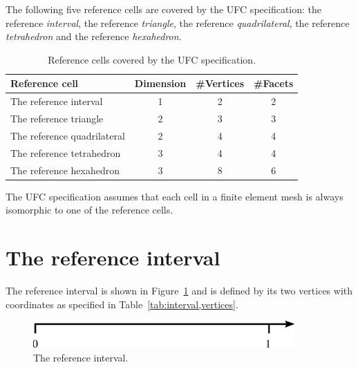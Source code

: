 The following five reference cells are covered by the UFC specification:
the reference \emph{interval},
the reference \emph{triangle},
the reference \emph{quadrilateral},
the reference \emph{tetrahedron} and
the reference \emph{hexahedron}.

\begin{table}[H]
\linespread{1.2}\selectfont
  \begin{center}
    \begin{tabular}{|l|c|c|c|}
      \hline
      Reference cell & Dimension & \#Vertices & \#Facets \\
      \hline
      \hline
      The reference interval      & 1 & 2 & 2 \\
      \hline
      The reference triangle      & 2 & 3 & 3 \\
      \hline
      The reference quadrilateral & 2 & 4 & 4 \\
      \hline
      The reference tetrahedron   & 3 & 4 & 4 \\
      \hline
      The reference hexahedron    & 3 & 8 & 6 \\
      \hline
    \end{tabular}
    \caption{Reference cells covered by the UFC specification.}
  \end{center}
\end{table}

The UFC specification assumes that each cell in a finite element mesh
is always isomorphic to one of the reference cells.

\newpage
\section{The reference interval}

The reference interval is shown in Figure~\ref{fig:interval} and is
defined by its two vertices with coordinates as specified in
Table~\ref{tab:interval,vertices}.

\begin{figure}[H]
  \begin{center}
    \includegraphics[width=10cm]{eps/interval.eps}
    \caption{The reference interval.}
    \label{fig:interval}
  \end{center}
\end{figure}

